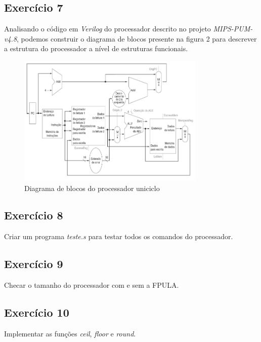 \documentclass[12pt, a4paper, twoside]{article}
\begin{document}
\subsection{Exercício 7}

Analisando o código em \textit{Verilog} do processador descrito no projeto \textit{MIPS-PUM-v4.8}, podemos construir o diagrama de blocos presente na figura 2 para descrever a estrutura do processador a nível de estruturas funcionais.

\begin{figure}
    \centering
    \includegraphics[width=0.8\textwidth]{./figs/q7.png}
    \caption{Diagrama de blocos do processador uniciclo}
\end{figure}


\subsection{Exercício 8}

Criar um programa \textit{teste.s} para testar todos os comandos do processador.

\subsection{Exercício 9}

Checar o tamanho do processador com e sem a FPULA.

\subsection{Exercício 10}

Implementar as funções \textit{ceil}, \textit{floor} e \textit{round}.
\end{document}
